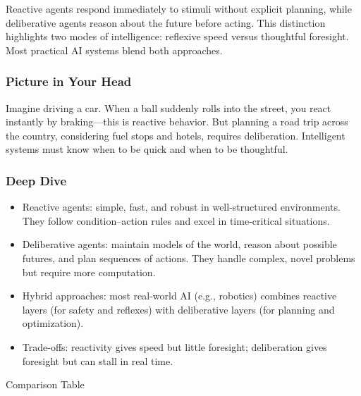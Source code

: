 \documentclass[
  letterpaper,
  DIV=11,
  numbers=noendperiod]{scrreprt}
\providecommand{\tightlist}{%
  \setlength{\itemsep}{0pt}\setlength{\parskip}{0pt}}
\begin{document}
Reactive agents respond immediately to stimuli without explicit
planning, while deliberative agents reason about the future before
acting. This distinction highlights two modes of intelligence: reflexive
speed versus thoughtful foresight. Most practical AI systems blend both
approaches.

\subsubsection{Picture in Your Head}\label{picture-in-your-head-6}

Imagine driving a car. When a ball suddenly rolls into the street, you
react instantly by braking---this is reactive behavior. But planning a
road trip across the country, considering fuel stops and hotels,
requires deliberation. Intelligent systems must know when to be quick
and when to be thoughtful.

\subsubsection{Deep Dive}\label{deep-dive-6}

\begin{itemize}
\tightlist
\item
  Reactive agents: simple, fast, and robust in well-structured
  environments. They follow condition--action rules and excel in
  time-critical situations.
\item
  Deliberative agents: maintain models of the world, reason about
  possible futures, and plan sequences of actions. They handle complex,
  novel problems but require more computation.
\item
  Hybrid approaches: most real-world AI (e.g., robotics) combines
  reactive layers (for safety and reflexes) with deliberative layers
  (for planning and optimization).
\item
  Trade-offs: reactivity gives speed but little foresight; deliberation
  gives foresight but can stall in real time.
\end{itemize}

Comparison Table
\end{document}

